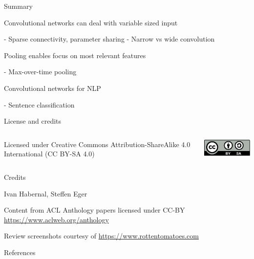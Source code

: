 \documentclass[12pt]{beamer}
\begin{document}
\begin{frame}{Summary}





Convolutional networks can deal with variable sized input

- Sparse connectivity, parameter sharing
- Narrow vs wide convolution

Pooling enables focus on most relevant features

- Max-over-time pooling

Convolutional networks for NLP

- Sentence classification
	
\end{frame}


\begin{frame}{License and credits}
	
	\begin{columns}
		\begin{column}{0.7\textwidth}
			Licensed under Creative Commons Attribution-ShareAlike 4.0 International (CC BY-SA 4.0)
		\end{column}
		\begin{column}{0.2\textwidth}
			\includegraphics[width=0.9\linewidth]{img/cc-by-sa-icon.pdf}
		\end{column}
	\end{columns}
	
	\bigskip
	
	Credits
	
	\begin{scriptsize}
		
		Ivan Habernal, Steffen Eger
		
		Content from ACL Anthology papers licensed under CC-BY \url{https://www.aclweb.org/anthology}
		
		Review screenshots courtesy of \url{https://www.rottentomatoes.com}
		
	\end{scriptsize}
	
\end{frame}

\begin{frame}[allowframebreaks]{References}
	\printbibliography
\end{frame}
\end{document}
